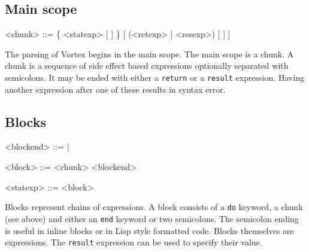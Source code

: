 \documentclass{article}
\newenvironment{bnf}
{
\begin{mdframed}
\begin{grammar}
}
{
\end{grammar}
\end{mdframed}
}
\begin{document}
\subsection{Main scope}
\begin{bnf}
<chunk> ::= \{ <statexp> [ \lit{;} ] \} [ (<retexp> | <resexp>) [ \lit{;} ] ]
\end{bnf}
The parsing of Vortex begins in the main scope. The main scope is a chunk.
A chunk is a sequence of side effect based expressions optionally separated
with semicolons. It may be ended with either a \verb|return| or a \verb|result|
expression. Having another expression after one of these results in syntax
error.
\subsection{Blocks}
\begin{bnf}
<blockend> ::=  | \lit{;;}

<block> ::=  <chunk> <blockend>

<statexp> ::= <block>
\end{bnf}
Blocks represent chains of expressions. A block consists of a \verb|do|
keyword, a chunk (see above) and either an \verb|end| keyword or two
semicolons. The semicolon ending is useful in inline blocks or in
Lisp style formatted code. Blocks themselves are expressions. The \verb|result|
expression can be used to specify their value.
\end{document}
